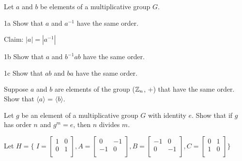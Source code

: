 \begin{question}{1}
Let $a$ and $b$ be elements of a multiplicative group $G$.
\begin{question}{1a}
Show that $a$ and $a^{-1}$ have the same order.

Claim: $|a| = |a^{-1}|$



\end{question}

\begin{question}{1b}
Show that $a$ and $b^{-1}ab$ have the same order.
\end{question}

\begin{question}{1c}
Show that $ab$ and $ba$ have the same order.
\end{question}

\end{question}


\begin{question}{2}
Suppose $a$ and $b$ are elements of the group ($\mathbb{Z}_n$, +) that have the same order. Show
that $\langle a \rangle$ = $\langle b \rangle$.
\end{question}


\begin{question}{3}
Let $g$ be an element of a multiplicative group $G$ with identity $e$. Show that if $g$ has
order $n$ and $g^m = e$, then $n$ divides $m$.


\end{question}


\begin{question}{4}
Let $H = \{$
$ I =
\begin{bmatrix}
1 & 0 \\
0 & 1 \\
\end{bmatrix},
A = 
\begin{bmatrix}
 0 & -1 \\
-1 &  0 \\
\end{bmatrix},
B = 
\begin{bmatrix}
-1 &  0 \\
 0 & -1 \\
\end{bmatrix},
C = 
\begin{bmatrix}
0 & 1 \\
1 & 0 \\
\end{bmatrix}
\}$
\end{question}

